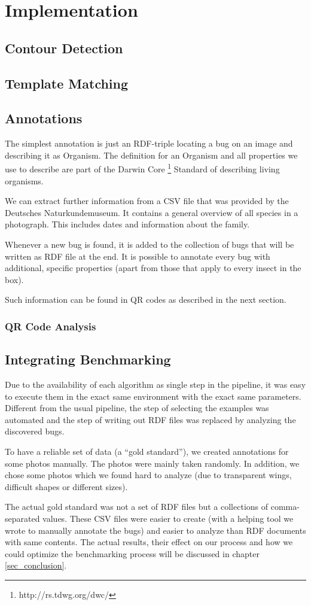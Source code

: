 %
\section{Implementation}
\label{sec_implementation}

\subsection{Contour Detection}
\subsection{Template Matching}


\subsection{Annotations}
The simplest annotation is just an RDF-triple locating a bug on an image and describing it as Organism. 
The definition for an Organism and all properties we use to describe are part of the Darwin Core \footnote{http://rs.tdwg.org/dwc/} Standard of describing living organisms.

We can extract further information from a CSV file that was provided by the Deutsches Naturkundemuseum.
It contains a general overview of all species in a photograph. 
This includes dates and information about the family.

Whenever a new bug is found, it is added to the collection of bugs that will be written as RDF file at the end.
It is possible to annotate every bug with additional, specific properties (apart from those that apply to every insect in the box).

Such information can be found in QR codes as described in the next section.

\subsubsection{QR Code Analysis}

\subsection{Integrating Benchmarking}
Due to the availability of each algorithm as single step in the pipeline, it was easy to execute them in the exact same environment with the exact same parameters. 
Different from the usual pipeline, the step of selecting the examples was automated and the step of writing out RDF files was replaced by analyzing the discovered bugs.

To have a reliable set of data (a ``gold standard''), we created annotations for some photos manually. 
The photos were mainly taken randomly. 
In addition, we chose some photos which we found hard to analyze (due to transparent wings, difficult shapes or different sizes).

The actual gold standard was not a set of RDF files but a collections of comma-separated values. 
These CSV files were easier to create (with a helping tool we wrote to manually annotate the bugs) and easier to analyze than RDF documents with same contents.
The actual results, their effect on our process and how we could optimize the benchmarking process will be discussed in chapter \ref{sec_conclusion}.
